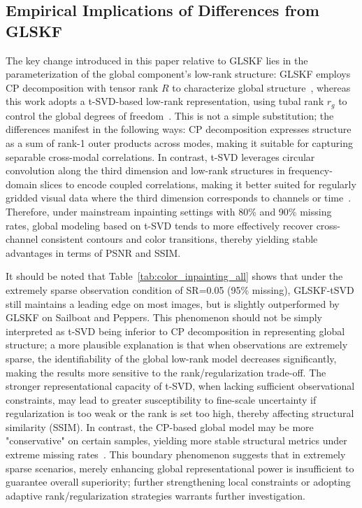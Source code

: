 \documentclass[a4paper,12pt]{article}
\numberwithin{equation}{section}
\numberwithin{algorithm}{section}
\theoremstyle{remark}
\theoremstyle{definition}
\begin{document}
\subsection{Empirical Implications of Differences from GLSKF}  
The key change introduced in this paper relative to GLSKF lies in the parameterization of the global component’s low-rank structure: GLSKF employs CP decomposition with tensor rank \(R\) to characterize global structure~\cite{lei2024glskf}, whereas this work adopts a t-SVD-based low-rank representation, using tubal rank \(r_g\) to control the global degrees of freedom~\cite{zhang2017tsvd}. This is not a simple substitution; the differences manifest in the following ways: CP decomposition expresses structure as a sum of rank-1 outer products across modes, making it suitable for capturing separable cross-modal correlations. In contrast, t-SVD leverages circular convolution along the third dimension and low-rank structures in frequency-domain slices to encode coupled correlations, making it better suited for regularly gridded visual data where the third dimension corresponds to channels or time~\cite{zhang2017tsvd}. Therefore, under mainstream inpainting settings with 80\% and 90\% missing rates, global modeling based on t-SVD tends to more effectively recover cross-channel consistent contours and color transitions, thereby yielding stable advantages in terms of PSNR and SSIM.


It should be noted that Table~\ref{tab:color_inpainting_all} shows that under the extremely sparse observation condition of SR=0.05 (95\% missing), GLSKF-tSVD still maintains a leading edge on most images, but is slightly outperformed by GLSKF on Sailboat and Peppers. This phenomenon should not be simply interpreted as t-SVD being inferior to CP decomposition in representing global structure; a more plausible explanation is that when observations are extremely sparse, the identifiability of the global low-rank model decreases significantly, making the results more sensitive to the rank/regularization trade-off. The stronger representational capacity of t-SVD, when lacking sufficient observational constraints, may lead to greater susceptibility to fine-scale uncertainty if regularization is too weak or the rank is set too high, thereby affecting structural similarity (SSIM). In contrast, the CP-based global model may be more "conservative" on certain samples, yielding more stable structural metrics under extreme missing rates~\cite{lei2024glskf}. This boundary phenomenon suggests that in extremely sparse scenarios, merely enhancing global representational power is insufficient to guarantee overall superiority; further strengthening local constraints or adopting adaptive rank/regularization strategies warrants further investigation.
\end{document}
